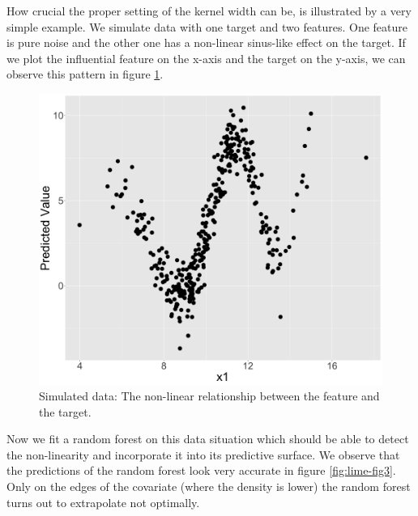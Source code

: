 \documentclass[
]{krantz}
\begin{document}
How crucial the proper setting of the kernel width can be, is illustrated by a very simple example.
We simulate data with one target and two features.
One feature is pure noise and the other one has a non-linear sinus-like effect on the target.
If we plot the influential feature on the x-axis and the target on the y-axis, we can observe this pattern in figure \ref{fig:lime-fig2}.

\begin{figure}

{\centering \includegraphics[width=0.99\linewidth]{images/04-09-02} 

}

\caption{Simulated data: The non-linear relationship between the feature and the target.}\label{fig:lime-fig2}
\end{figure}

Now we fit a random forest on this data situation which should be able to detect the non-linearity and incorporate it into its predictive surface.
We observe that the predictions of the random forest look very accurate in figure \ref{fig:lime-fig3}.
Only on the edges of the covariate (where the density is lower) the random forest turns out to extrapolate not optimally.
\end{document}
